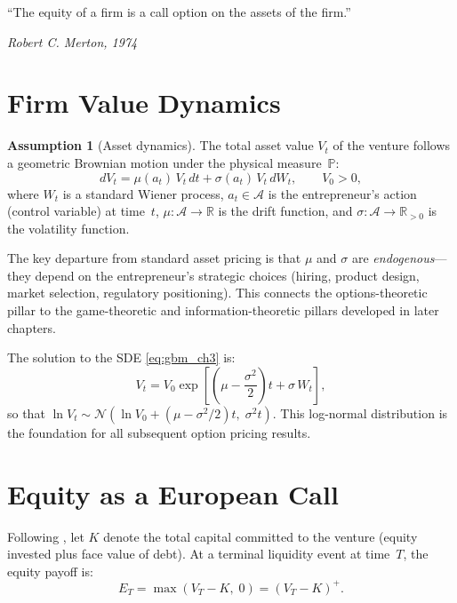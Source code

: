 \documentclass[12pt,a4paper,oneside]{book}
\theoremstyle{definition}
\newtheorem{assumption}[theorem]{Assumption}
\theoremstyle{remark}
\newcommand{\Prob}{\mathbb{P}}
\newcommand{\R}{\mathbb{R}}
\begin{document}
\epigraph{``The equity of a firm is a call option on the assets of the firm.''}
{\textit{Robert C. Merton, 1974}}

\section{Firm Value Dynamics}

\begin{assumption}[Asset dynamics]\label{ass:gbm}
The total asset value $V_t$ of the venture follows a geometric Brownian
motion under the physical measure~$\Prob$:
\begin{equation}\label{eq:gbm_ch3}
  dV_t = \mu(a_t)\,V_t\,dt + \sigma(a_t)\,V_t\,dW_t,
  \qquad V_0 > 0,
\end{equation}
where $W_t$ is a standard Wiener process, $a_t \in \mathcal{A}$ is the
entrepreneur's action (control variable) at time~$t$, $\mu:\mathcal{A}\to\R$
is the drift function, and $\sigma:\mathcal{A}\to\R_{>0}$ is the volatility
function.
\end{assumption}

The key departure from standard asset pricing is that $\mu$ and $\sigma$
are \emph{endogenous}---they depend on the entrepreneur's strategic choices
(hiring, product design, market selection, regulatory positioning). This
connects the options-theoretic pillar to the game-theoretic and
information-theoretic pillars developed in later chapters.

The solution to the SDE \eqref{eq:gbm_ch3} is:
\begin{equation}\label{eq:gbm_solution}
  V_t = V_0 \exp\!\left[\left(\mu - \frac{\sigma^2}{2}\right)t
    + \sigma\,W_t\right],
\end{equation}
so that $\ln V_t \sim \mathcal{N}\!\left(\ln V_0 + (\mu - \sigma^2/2)t,\;
\sigma^2 t\right)$. This log-normal distribution is the foundation for all
subsequent option pricing results.

\section{Equity as a European Call}

Following \citet{Merton1974}, let $K$ denote the total capital committed to
the venture (equity invested plus face value of debt). At a terminal liquidity
event at time~$T$, the equity payoff is:
\begin{equation}\label{eq:equity_payoff}
  E_T = \max(V_T - K,\; 0) = (V_T - K)^+.
\end{equation}
\end{document}
